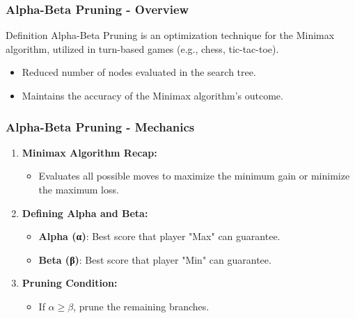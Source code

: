 \documentclass[aspectratio=169]{beamer}
\begin{document}
\begin{frame}[fragile]
    \frametitle{Alpha-Beta Pruning - Overview}
    \begin{block}{Definition}
        Alpha-Beta Pruning is an optimization technique for the Minimax algorithm, utilized in turn-based games (e.g., chess, tic-tac-toe).
    \end{block}
    \begin{itemize}
        \item Reduced number of nodes evaluated in the search tree.
        \item Maintains the accuracy of the Minimax algorithm's outcome.
    \end{itemize}
\end{frame}

\begin{frame}[fragile]
    \frametitle{Alpha-Beta Pruning - Mechanics}
    \begin{enumerate}
        \item \textbf{Minimax Algorithm Recap:}
        \begin{itemize}
            \item Evaluates all possible moves to maximize the minimum gain or minimize the maximum loss.
        \end{itemize}
        
        \item \textbf{Defining Alpha and Beta:}
        \begin{itemize}
            \item \textbf{Alpha (α)}: Best score that player "Max" can guarantee.
            \item \textbf{Beta (β)}: Best score that player "Min" can guarantee.
        \end{itemize}
        
        \item \textbf{Pruning Condition:}
        \begin{itemize}
            \item If \( \alpha \geq \beta \), prune the remaining branches.
        \end{itemize}
    \end{enumerate}
\end{frame}
\end{document}
